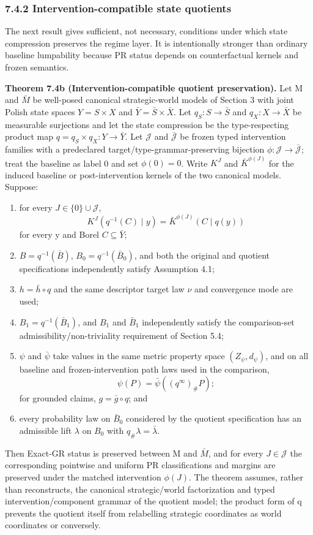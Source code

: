 \documentclass[10pt]{article}
\newcommand{\push}{\mathord{\#}}
\begin{document}
\subsubsection{7.4.2 Intervention-compatible state quotients}\label{intervention-compatible-state-quotients}

The next result gives sufficient, not necessary, conditions under which state compression preserves the regime layer. It is intentionally stronger than ordinary baseline lumpability because PR status depends on counterfactual kernels and frozen semantics.

\textbf{Theorem 7.4b (Intervention-compatible quotient preservation).} Let M and \(\bar M\) be well-posed canonical strategic-world models of Section 3 with joint Polish state spaces \(Y=S\times X\) and \(\bar Y=\bar S\times\bar X\). Let \(q_S:S\to\bar S\) and \(q_X:X\to\bar X\) be measurable surjections and let the state compression be the type-respecting product map \(q=q_S\times q_X:Y\to\bar Y\). Let \(\mathcal J\) and \(\bar{\mathcal J}\) be frozen typed intervention families with a predeclared target/type-grammar-preserving bijection \(\phi:\mathcal J\to\bar{\mathcal J}\); treat the baseline as label 0 and set \(\phi(0)=0\). Write \(K^J\) and \(\bar K^{\phi(J)}\) for the induced baseline or post-intervention kernels of the two canonical models. Suppose:
\begin{enumerate}[label=(\roman*),leftmargin=2.2em]
\item for every \(J\in\{0\}\cup\mathcal J\),
\[
K^J(q^{-1}(C)\mid y)=\bar K^{\phi(J)}(C\mid q(y))
\]
for every y and Borel \(C\subseteq\bar Y\);
\item \(B=q^{-1}(\bar B)\), \(B_0=q^{-1}(\bar B_0)\), and both the original and quotient specifications independently satisfy Assumption 4.1;
\item \(h=\bar h\circ q\) and the same descriptor target law \(\nu\) and convergence mode are used;
\item \(B_1=q^{-1}(\bar B_1)\), and \(B_1\) and \(\bar B_1\) independently satisfy the comparison-set admissibility/non-triviality requirement of Section 5.4;
\item \(\psi\) and \(\bar\psi\) take values in the same metric property space \((Z_\psi,d_\psi)\), and on all baseline and frozen-intervention path laws used in the comparison,
\[
\psi(P)=\bar\psi\!\left((q^\infty)_{\push}P\right);
\]
for grounded claims, \(g=\bar g\circ q\); and
\item every probability law on \(\bar B_0\) considered by the quotient specification has an admissible lift \(\lambda\) on \(B_0\) with \(q_{\push}\lambda=\bar\lambda\).
\end{enumerate}
Then Exact-GR status is preserved between M and \(\bar M\), and for every \(J\in\mathcal J\) the corresponding pointwise and uniform PR classifications and margins are preserved under the matched intervention \(\phi(J)\). The theorem assumes, rather than reconstructs, the canonical strategic/world factorization and typed intervention/component grammar of the quotient model; the product form of q prevents the quotient itself from relabelling strategic coordinates as world coordinates or conversely.
\end{document}
